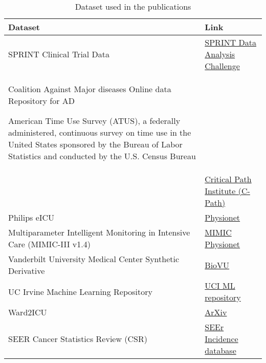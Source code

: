 \begin{table}[H]
    \footnotesize
    \caption{Dataset used in the publications\label{tab:5:datasets}}
    \begin{tabularx}{\textwidth}{@{}XX@{}}\toprule
    Dataset & Link\\\midrule
    
    SPRINT Clinical Trial Data \cite{wright2016randomized} 
      
    & \href{https://challenge.nejm.org/pages/home}{SPRINT Data Analysis Challenge}\\
    
    Coalition Against Major diseases Online data Repository for AD \cite{Neville_2015} 
     
    American Time Use Survey (ATUS), a federally administered, continuous survey on time use in the United States sponsored by the Bureau of Labor Statistics and conducted by the U.S. Census Bureau & \cite{us_bureau_of_labor_statistics_american_nodate}\\
     
    & \href{https://c-path.org/programs/dcc/projects/alzheimers-disease/coalition-against-major-diseases-consortium-database-camd-admci/}{Critical Path Institute (C-Path)}\\

    Philips eICU \cite{pollard2018eicu}    & \href{https://physionet.org}{Physionet \cite{Goldberger_2000}}\\
    
    Multiparameter Intelligent Monitoring in Intensive Care (MIMIC-III v1.4) \cite{Johnson_2016}   & \href{https://mimic.physionet.org}{MIMIC Physionet} \cite{Goldberger_2000}\\
    
    Vanderbilt University Medical Center Synthetic Derivative \cite{Roden_2008}   & \href{https://victr.vumc.org/biovu-description/}{BioVU}\\
    
    UC Irvine Machine Learning Repository \cite{Dua:2019}  & \href{http://archive.ics.uci.edu/ml/index.php }{UCI ML repository}\\
    
    Ward2ICU \cite{severo2019ward2icu}     & \href{https://arxiv.org/abs/1910.00752}{ArXiv}\\
    
    SEER Cancer Statistics Review (CSR) \cite{noone2018cronin}   & \href{https://seer.cancer.gov/data/access.html}{SEEr Incidence database}\\
    

\end{tabularx}
\end{table}
